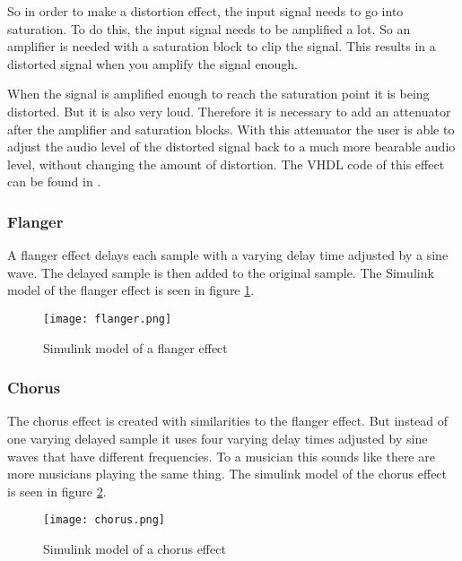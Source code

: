 So in order to make a distortion effect, the input signal needs to go into saturation. To do this, the input signal needs to be amplified a lot. So an amplifier is needed with a saturation block to clip the signal. This results in a distorted signal when you amplify the signal enough.

When the signal is amplified enough to reach the saturation point it is being distorted. But it is also very loud. Therefore it is necessary to add an attenuator after the amplifier and saturation blocks. With this attenuator the user is able to adjust the audio level of the distorted signal back to a much more bearable audio level, without changing the amount of distortion. The VHDL code of this effect can be found in .

\subsubsection{Flanger}
A flanger effect delays each sample with a varying delay time adjusted by a sine wave. The delayed sample is then added to the original sample. The Simulink model of the flanger effect is seen in figure \ref{fig:flangersimulink}.

\begin{figure}[ht]
    \centering
    \texttt{[image: flanger.png]}
    \caption{Simulink model of a flanger effect}
    \label{fig:flangersimulink}
\end{figure}

\subsubsection{Chorus}
The chorus effect is created with similarities to the flanger effect. But instead of one varying delayed sample it uses four varying delay times adjusted by sine waves that have different frequencies. To a musician this sounds like there are more musicians playing the same thing. The simulink model of the chorus effect is seen in figure \ref{fig:chorussimulink}.

\begin{figure}[ht]
    \texttt{[image: chorus.png]}
    \caption{Simulink model of a chorus effect}
    \label{fig:chorussimulink}
\end{figure}

